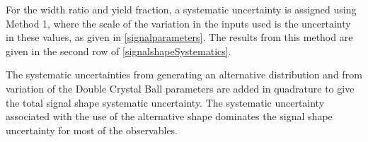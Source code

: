 For the width ratio and yield fraction, a systematic uncertainty is assigned using Method 1, where the scale of the variation in the inputs used is the uncertainty in these values, as given in \tab\ref{signalparameters}. The results from this method are given in the second row of \tab\ref{signalshapeSystematics}. 

The systematic uncertainties from generating an alternative distribution and from variation of the Double Crystal Ball parameters are added in quadrature to give the total signal shape systematic uncertainty. The systematic uncertainty associated with the use of the alternative shape dominates the signal shape uncertainty for most of the \CP observables.

\begin{table}[h]
\centering
{}
\caption{Summary of systematic uncertainties associated with the signal shape.}
\label{signalshapeSystematics}
\end{table}

